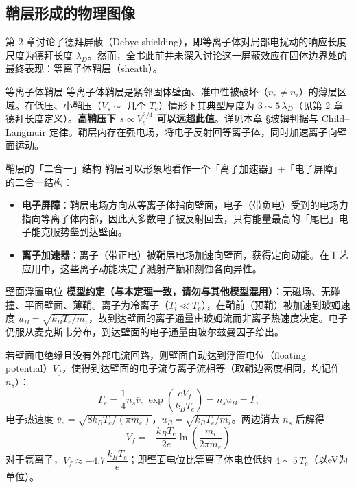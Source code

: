 \documentclass[12pt,a4paper,openany,oneside]{book}
\begin{document}
\subsection{鞘层形成的物理图像}

第 2 章讨论了德拜屏蔽（Debye shielding），即等离子体对局部电扰动的响应长度尺度为德拜长度 $\lambda_D$。然而，全书此前并未深入讨论这一屏蔽效应在固体边界处的最终表现：等离子体鞘层（sheath）。

\begin{definition}{等离子体鞘层}{}{}
\label{def:sheath}
等离子体鞘层是紧邻固体壁面、准中性被破坏（$n_e \neq n_i$）的薄层区域。在低压、小鞘压（$V_s\sim$ 几个 $T_e$）情形下其典型厚度为 $3\sim 5\,\lambda_D$（见第 2 章德拜长度定义）。\textbf{高鞘压下 $s\propto V_s^{3/4}$ 可以远超此值}。详见本章 \S 玻姆判据与 Child--Langmuir 定律。鞘层内存在强电场，将电子反射回等离子体，同时加速离子向壁面运动。
\end{definition}

\begin{insight}{鞘层的「二合一」结构}{}
鞘层可以形象地看作一个「离子加速器」+「电子屏障」的二合一结构：
\begin{itemize}
\item \textbf{电子屏障}：鞘层电场方向从等离子体指向壁面，电子（带负电）受到的电场力指向等离子体内部，因此大多数电子被反射回去，只有能量最高的「尾巴」电子能克服势垒到达壁面。
\item \textbf{离子加速器}：离子（带正电）被鞘层电场加速向壁面，获得定向动能。在工艺应用中，这些离子动能决定了溅射产额和刻蚀各向异性。
\end{itemize}
\end{insight}

\begin{theorem}{壁面浮置电位}{}{}
\label{thm:floating-potential}
\textbf{模型约定（与本定理一致，请勿与其他模型混用）：}无磁场、无碰撞、平面壁面、薄鞘。离子为冷离子（$T_i \ll T_e$），在鞘前（预鞘）被加速到玻姆速度 $u_B = \sqrt{k_BT_e/m_i}$，故到达壁面的离子通量由玻姆流而非离子热速度决定。电子仍服从麦克斯韦分布，到达壁面的电子通量由玻尔兹曼因子给出。

若壁面电绝缘且没有外部电流回路，则壁面自动达到浮置电位（floating potential）$V_f$，使得到达壁面的电子流与离子流相等（取鞘边密度相同，均记作 $n_s$）：
\begin{equation}
\label{eq:floating-potential}
\Gamma_e = \frac{1}{4} n_s \bar{v}_e \,\exp\!\left(\frac{eV_f}{k_B T_e}\right)
= n_s u_B = \Gamma_i
\end{equation}
电子热速度 $\bar{v}_e = \sqrt{8k_BT_e/(\pi m_e)}$，$u_B=\sqrt{k_BT_e/m_i}$。两边消去 $n_s$ 后解得
\begin{equation}
V_f = -\frac{k_B T_e}{2e} \ln\!\left(\frac{m_i}{2\pi m_e}\right)
\end{equation}
对于氩离子，$V_f \approx -4.7\,\dfrac{k_B T_e}{e}$；即壁面电位比等离子体电位低约 $4\sim 5\,T_e$（以eV为单位）。
\end{theorem}
\end{document}
